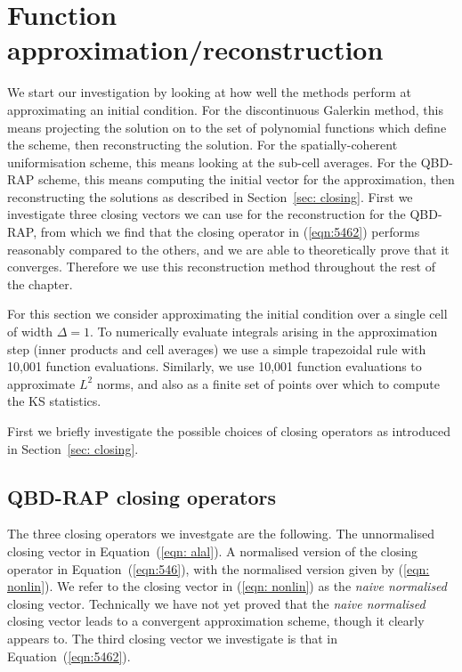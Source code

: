 


	




\section{Function approximation/reconstruction}
We start our investigation by looking at how well the methods perform at approximating an initial condition. For the discontinuous Galerkin method, this means projecting the solution on to the set of polynomial functions which define the scheme, then reconstructing the solution. For the spatially-coherent uniformisation scheme, this means looking at the sub-cell averages. For the QBD-RAP scheme, this means computing the initial vector for the approximation, then reconstructing the solutions as described in Section~\ref{sec: closing}. First we investigate three closing vectors we can use for the reconstruction for the QBD-RAP, from which we find that the closing operator in (\ref{eqn:5462}) performs reasonably compared to the others, and we are able to theoretically prove that it converges. Therefore we use this reconstruction method throughout the rest of the chapter.

For this section we consider approximating the initial condition over a single cell of width \(\Delta = 1\). To numerically evaluate integrals arising in the approximation step (inner products and cell averages) we use a simple trapezoidal rule with 10,001 function evaluations. Similarly, we use 10,001 function evaluations to approximate \(L^2\) norms, and also as a finite set of points over which to compute the KS statistics. 

First we briefly investigate the possible choices of closing operators as introduced in Section~\ref{sec: closing}. 

\subsection{QBD-RAP closing operators}
The three closing operators we investgate are the following. The unnormalised closing vector in Equation~(\ref{eqn: alal}). A normalised version of the closing operator in Equation~(\ref{eqn:546}), with the normalised version given by (\ref{eqn: nonlin}). We refer to the closing vector in (\ref{eqn: nonlin}) as the \emph{naive normalised} closing vector. Technically we have not yet proved that the \emph{naive normalised} closing vector leads to a convergent approximation scheme, though it clearly appears to. The third closing vector we investigate is that in Equation~(\ref{eqn:5462}). 

